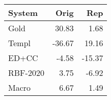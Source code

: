 \begin{tabular}{lrr}
\toprule
System & Orig & Rep \\
\midrule
Gold & 30.83 & 1.68 \\
Templ & -36.67 & 19.16 \\
ED+CC & -4.58 & -15.37 \\
RBF-2020 & 3.75 & -6.92 \\
Macro & 6.67 & 1.49 \\
\bottomrule
\end{tabular}
